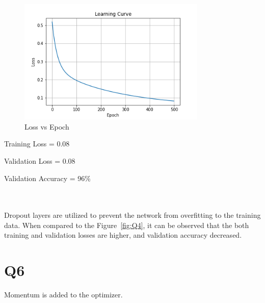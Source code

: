 \documentclass[11pt]{extarticle}
\begin{document}
\begin{figure}[h]
\centering
\includegraphics[width=0.8\textwidth]{Q5.png}
\caption{Loss vs Epoch}\label{fig:Q5}
\end{figure}
\begin{minipage}{0.3\textwidth}
    Training Loss = 0.08
\end{minipage}
\begin{minipage}{0.3\textwidth}
    Validation Loss = 0.08
\end{minipage}
\begin{minipage}{0.3\textwidth}
    Validation Accuracy = 96\%
\end{minipage}
\\
\\
Dropout layers are utilized to prevent the network from overfitting to the training data. When compared to the Figure~\ref{fig:Q4}, it can be observed that the both training and validation losses are higher, and validation accuracy decreased. 
\pagebreak

\section{Q6}

Momentum is added to the optimizer. 
\end{document}
